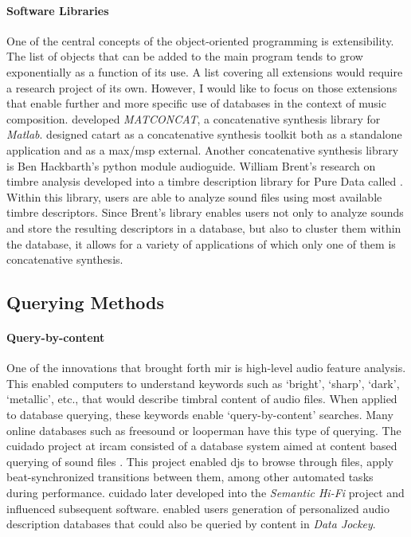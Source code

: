 \documentclass[
]{book}
\newcommand{\obj}[1]{\framebox{{\small\textbf{\texttt{#1}}}}}
\begin{document}
\paragraph{Software Libraries}
One of the central concepts of the object-oriented programming is extensibility. The list of objects that can be added to the main program tends to grow exponentially as a function of its use. A list covering all extensions would require a research project of its own. However, I would like to focus on those extensions that enable further and more specific use of databases in the context of music composition. \textcite{Stu04:Mat} developed \textit{MATCONCAT}, a concatenative synthesis library for \textit{Matlab}. \textcite{Sch06:Rea} designed \gls{catart} as a concatenative synthesis toolkit both as a standalone application and as a \gls{max/msp} external. Another concatenative synthesis library is Ben Hackbarth's python module \gls{audioguide}. William Brent's research on timbre analysis developed into a timbre description library for Pure Data called \obj{timbreID} \parencite{icmc/bbp2372.2010.044}. Within this library, users are able to analyze sound files using most available timbre descriptors. Since Brent's library enables users not only to analyze sounds and store the resulting descriptors in a database, but also to cluster them within the database, it allows for a variety of applications of which only one of them is concatenative synthesis.

\subsection{Querying Methods}

\paragraph{Query-by-content}
One of the innovations that brought forth \gls{mir} is high-level audio feature analysis. This enabled computers to understand keywords such as `bright', `sharp', `dark', `metallic', etc., that would describe timbral content of audio files. When applied to database querying, these keywords enable `query-by-content' searches. Many online databases such as \gls{freesound} or \gls{looperman} have this type of querying. The \gls{cuidado} project at \gls{ircam} consisted of a database system aimed at content based querying of sound files \parencites{DBLP:conf/ismir/VinetHP02}{DBLP:conf/icmc/VinetHP02}{DBLP:conf/icmc/Vinet05}. This project enabled \glspl{dj} to browse through files, apply beat-synchronized transitions between them, among other automated tasks during performance. \gls{cuidado} later developed into the \textit{Semantic Hi-Fi} project and influenced subsequent software. \textcite{icmc/bbp2372.2007.117} enabled users generation of personalized audio description databases that could also be queried by content in \textit{Data Jockey}.
\end{document}
